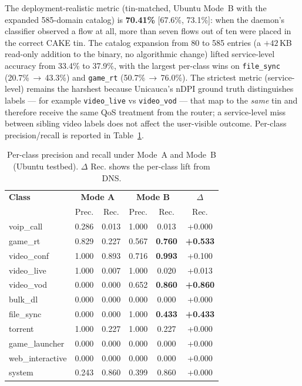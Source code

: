 \documentclass[journal,onecolumn]{IEEEtran}
\begin{document}
The deployment-realistic metric (tin-matched, Ubuntu Mode~B with the
expanded 585-domain catalog) is \textbf{70.41\%} [67.6\%, 73.1\%]: when
the daemon's classifier observed a flow at all, more than seven flows
out of ten were placed in the correct CAKE tin. The catalog expansion
from 80 to 585 entries (a $+42$\,KB read-only addition to the binary,
no algorithmic change) lifted service-level accuracy from 33.4\% to
37.9\%, with the largest per-class wins on \texttt{file\_sync}
(20.7\%\,$\rightarrow$\,43.3\%) and \texttt{game\_rt}
(50.7\%\,$\rightarrow$\,76.0\%). The strictest metric (service-level)
remains the harshest because Unicauca's nDPI ground truth distinguishes
labels — for example \texttt{video\_live} vs \texttt{video\_vod} — that
map to the \emph{same} tin and therefore receive the same QoS treatment
from the router; a service-level miss between sibling video labels does
not affect the user-visible outcome. Per-class precision/recall is
reported in Table~\ref{tab:invivo_perclass}.

\begin{table}[t]
\centering
\caption{Per-class precision and recall under Mode~A and Mode~B
(Ubuntu testbed). $\Delta$ Rec. shows the per-class lift from DNS.}
\label{tab:invivo_perclass}
\begin{tabular}{l|cc|cc|c}
\toprule
\textbf{Class} & \multicolumn{2}{c|}{\textbf{Mode A}} & \multicolumn{2}{c|}{\textbf{Mode B}} & $\Delta$ \\
 & Prec. & Rec. & Prec. & Rec. & Rec. \\
\midrule
voip\_call        & 0.286 & 0.013 & 1.000 & 0.013 & +0.000 \\
game\_rt          & 0.829 & 0.227 & 0.567 & \textbf{0.760} & \textbf{+0.533} \\
video\_conf       & 1.000 & 0.893 & 0.716 & \textbf{0.993} & +0.100 \\
video\_live       & 1.000 & 0.007 & 1.000 & 0.020 & +0.013 \\
video\_vod        & 0.000 & 0.000 & 0.652 & \textbf{0.860} & \textbf{+0.860} \\
bulk\_dl          & 0.000 & 0.000 & 0.000 & 0.000 & +0.000 \\
file\_sync        & 0.000 & 0.000 & 1.000 & \textbf{0.433} & \textbf{+0.433} \\
torrent           & 1.000 & 0.227 & 1.000 & 0.227 & +0.000 \\
game\_launcher    & 0.000 & 0.000 & 0.000 & 0.000 & +0.000 \\
web\_interactive  & 0.000 & 0.000 & 0.000 & 0.000 & +0.000 \\
system            & 0.243 & 0.860 & 0.399 & 0.860 & +0.000 \\
\bottomrule
\end{tabular}
\end{table}
\end{document}
